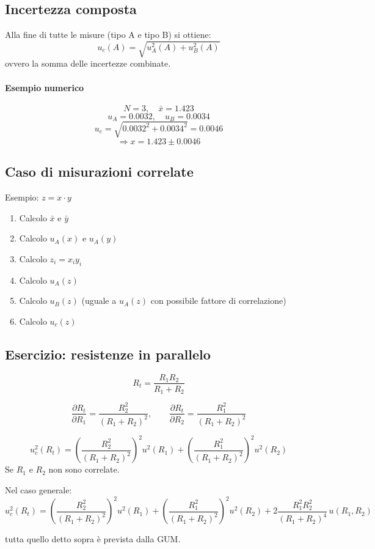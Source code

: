 \subsection*{Incertezza composta}
Alla fine di tutte le misure (tipo A e tipo B) si ottiene:
\[
u_c(A) = \sqrt{u_A^2(A) + u_B^2(A)}
\]
ovvero la somma delle incertezze combinate.

\paragraph{Esempio numerico}
\[
N = 3, \quad \bar{x} = 1.423
\]
\[
u_A = 0.0032, \quad u_B = 0.0034
\]
\[
u_c = \sqrt{0.0032^2 + 0.0034^2} = 0.0046
\]
\[
\Rightarrow x = 1.423 \pm 0.0046
\]

\subsection*{Caso di misurazioni correlate}
Esempio: $z = x \cdot y$

\begin{enumerate}[label=\Roman*.]
\item Calcolo $\bar{x}$ e $\bar{y}$
\item Calcolo $u_A(x)$ e $u_A(y)$
\item Calcolo $z_i = x_i y_i$
\item Calcolo $u_A(z)$
\item Calcolo $u_B(z)$ (uguale a $u_A(z)$ con possibile fattore di correlazione)
\item Calcolo $u_c(z)$
\end{enumerate}

\subsection*{Esercizio: resistenze in parallelo}
\[
R_t = \frac{R_1 R_2}{R_1 + R_2}
\]

\[
\frac{\partial R_t}{\partial R_1} = \frac{R_2^2}{(R_1+R_2)^2}, \qquad 
\frac{\partial R_t}{\partial R_2} = \frac{R_1^2}{(R_1+R_2)^2}
\]

\[
u_c^2(R_t) = \left(\frac{R_2^2}{(R_1+R_2)^2}\right)^2 u^2(R_1)
+ \left(\frac{R_1^2}{(R_1+R_2)^2}\right)^2 u^2(R_2)
\]
Se $R_1$ e $R_2$ non sono correlate.

Nel caso generale:
\[
u_c^2(R_t) =
\left(\frac{R_2^2}{(R_1+R_2)^2}\right)^2 u^2(R_1)
+ \left(\frac{R_1^2}{(R_1+R_2)^2}\right)^2 u^2(R_2)
+ 2 \frac{R_1^2 R_2^2}{(R_1+R_2)^4} \, u(R_1,R_2)
\]

tutta quello detto sopra è prevista dalla GUM.
